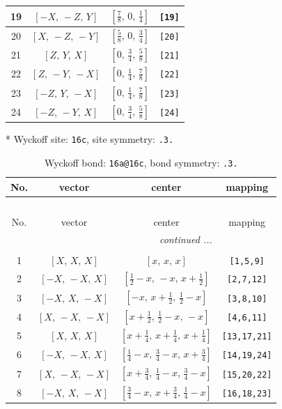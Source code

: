 \documentclass[fleqn,8pt]{jsarticle}
\begin{document}
\begin{longtable}{cccc}
19 & $\left[ - X,\, - Z,\, Y \right]$ & $\left[ \frac{7}{8},\, 0,\, \frac{1}{4} \right]$ & {\tt [19]} \\ \hline
20 & $\left[ X,\, - Z,\, - Y \right]$ & $\left[ \frac{5}{8},\, 0,\, \frac{3}{4} \right]$ & {\tt [20]} \\ \hline
21 & $\left[ Z,\, Y,\, X \right]$ & $\left[ 0,\, \frac{3}{4},\, \frac{5}{8} \right]$ & {\tt [21]} \\ \hline
22 & $\left[ Z,\, - Y,\, - X \right]$ & $\left[ 0,\, \frac{1}{4},\, \frac{7}{8} \right]$ & {\tt [22]} \\ \hline
23 & $\left[ - Z,\, Y,\, - X \right]$ & $\left[ 0,\, \frac{1}{4},\, \frac{7}{8} \right]$ & {\tt [23]} \\ \hline
24 & $\left[ - Z,\, - Y,\, X \right]$ & $\left[ 0,\, \frac{3}{4},\, \frac{5}{8} \right]$ & {\tt [24]} \\
\end{longtable}
* Wyckoff site: {\tt 16c}, site symmetry: {\tt .3.}
\renewcommand{\arraystretch}{1.2}
\begin{longtable}{cccc}
\caption{Wyckoff bond: {\tt 16a@16c}, bond symmetry: {\tt .3.}}
 \\
 \hline \hline
No. & vector & center & mapping \\ \hline \endfirsthead

\multicolumn{3}{l}{\tablename\ \thetable{}} \\
 \hline \hline
No. & vector & center & mapping \\ \hline \endhead

 \hline \hline
\multicolumn{3}{r}{\footnotesize\it continued ...} \\ \endfoot

 \hline \hline
\multicolumn{3}{r}{} \\ \endlastfoot

1 & $\left[ X,\, X,\, X \right]$ & $\left[ x,\, x,\, x \right]$ & {\tt [1,5,9]} \\ \hline
2 & $\left[ - X,\, - X,\, X \right]$ & $\left[ \frac{1}{2} - x,\, - x,\, x + \frac{1}{2} \right]$ & {\tt [2,7,12]} \\ \hline
3 & $\left[ - X,\, X,\, - X \right]$ & $\left[ - x,\, x + \frac{1}{2},\, \frac{1}{2} - x \right]$ & {\tt [3,8,10]} \\ \hline
4 & $\left[ X,\, - X,\, - X \right]$ & $\left[ x + \frac{1}{2},\, \frac{1}{2} - x,\, - x \right]$ & {\tt [4,6,11]} \\ \hline
5 & $\left[ X,\, X,\, X \right]$ & $\left[ x + \frac{1}{4},\, x + \frac{1}{4},\, x + \frac{1}{4} \right]$ & {\tt [13,17,21]} \\ \hline
6 & $\left[ - X,\, - X,\, X \right]$ & $\left[ \frac{1}{4} - x,\, \frac{3}{4} - x,\, x + \frac{3}{4} \right]$ & {\tt [14,19,24]} \\ \hline
7 & $\left[ X,\, - X,\, - X \right]$ & $\left[ x + \frac{3}{4},\, \frac{1}{4} - x,\, \frac{3}{4} - x \right]$ & {\tt [15,20,22]} \\ \hline
8 & $\left[ - X,\, X,\, - X \right]$ & $\left[ \frac{3}{4} - x,\, x + \frac{3}{4},\, \frac{1}{4} - x \right]$ & {\tt [16,18,23]} \\
\end{longtable}
\end{document}
